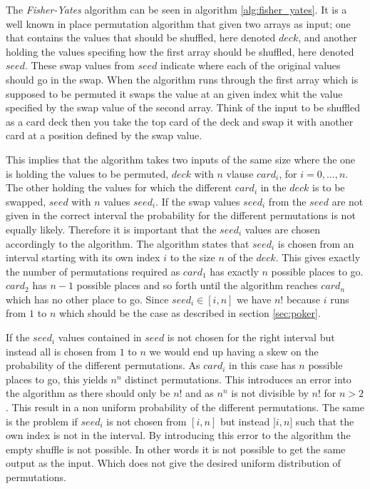 \documentclass[twoside,11pt,openright]{report}
\newcommand{\FY}{\textit{Fisher-Yates} }
\begin{document}
The \FY algorithm can be seen in algorithm \ref{alg:fisher_yates}. It is a well known in place permutation algorithm that given two arrays as input; one that contains the values that should be shuffled, here denoted $deck$, and another holding the values specifing how the first array should be shuffled, here denoted $seed$. These swap values from $seed$ indicate where each of the original values should go in the swap. When the algorithm runs through the first array which is supposed to be permuted it swaps the value at an given index whit the value specified by the swap value of the second array. Think of the input to be shuffled as a card deck then you take the top card of the deck and swap it with another card at a position defined by the swap value.

This implies that the algorithm takes two inputs of the same size where the one is holding the values to be permuted, $deck$ with $n$ vlause $card_i$, for $i=0,\dots,n$. The other holding the values for which the different $card_i$ in the $deck$ is to be swapped, $seed$ with $n$ values $seed_i$. If the swap values $seed_i$ from the $seed$ are not given in the correct interval the probability for the different permutations is not equally likely. Therefore it is important that the $seed_i$ values are chosen accordingly to the algorithm. The algorithm states that $seed_i$ is chosen from an interval starting with its own index $i$ to the size $n$ of the $deck$. This gives exactly the number of permutations required as $card_1$ has exactly $n$ possible places to go. $card_2$ has $n-1$ possible places and so forth until the algorithm reaches $card_n$ which has no other place to go. Since $seed_i\in[i,n]$ we have $n!$ because $i$ runs from $1$ to $n$ which should be the case as described in section \ref{sec:poker}.

If the $seed_i$ values contained in $seed$ is not chosen for the right interval but instead all is chosen from $1$ to $n$ we would end up having a skew on the probability of the different permutations. As $card_i$ in this case has $n$ possible places to go, this yields $n^n$ distinct permutations. This introduces an error into the algorithm as there should only be $n!$ and as $n^n$ is not divisible by $n!$ for $n>2$. This result in a non uniform probability of the different permutations. The same is the problem if $seed_i$ is not chosen from $[i,n]$ but instead $]i,n]$ such that the own index is not in the interval. By introducing this error to the algorithm the empty shuffle is not possible. In other words it is not possible to get the same output as the input. Which does not give the desired uniform distribution of permutations.
\end{document}
